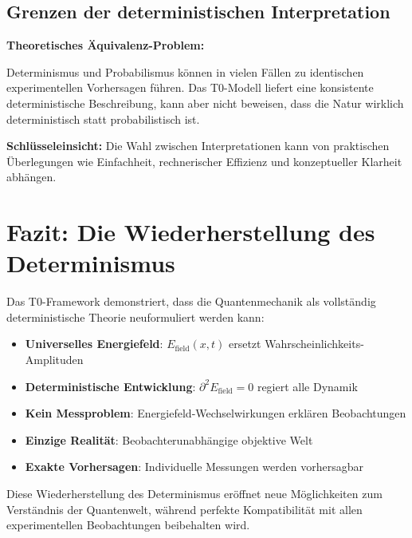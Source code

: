 \documentclass[12pt,a4paper]{report}
\begin{document}
\subsection{Grenzen der deterministischen Interpretation}
\label{subsec:limits_deterministic}

\begin{tcolorbox}[colback=yellow!5!white,colframe=orange!75!black,title=Epistemologische Warnung]
	\textbf{Theoretisches Äquivalenz-Problem:}
	
	Determinismus und Probabilismus können in vielen Fällen zu identischen experimentellen Vorhersagen führen. Das T0-Modell liefert eine konsistente deterministische Beschreibung, kann aber nicht beweisen, dass die Natur wirklich deterministisch statt probabilistisch ist.
	
	\textbf{Schlüsseleinsicht:} Die Wahl zwischen Interpretationen kann von praktischen Überlegungen wie Einfachheit, rechnerischer Effizienz und konzeptueller Klarheit abhängen.
\end{tcolorbox}

\section{Fazit: Die Wiederherstellung des Determinismus}
\label{sec:conclusion_determinism}

Das T0-Framework demonstriert, dass die Quantenmechanik als vollständig deterministische Theorie neuformuliert werden kann:

\begin{itemize}
	\item \textbf{Universelles Energiefeld}: $E_{\text{field}}(x,t)$ ersetzt Wahrscheinlichkeits-Amplituden
	\item \textbf{Deterministische Entwicklung}: $\partial^2 E_{\text{field}} = 0$ regiert alle Dynamik
	\item \textbf{Kein Messproblem}: Energiefeld-Wechselwirkungen erklären Beobachtungen
	\item \textbf{Einzige Realität}: Beobachterunabhängige objektive Welt
	\item \textbf{Exakte Vorhersagen}: Individuelle Messungen werden vorhersagbar
\end{itemize}

Diese Wiederherstellung des Determinismus eröffnet neue Möglichkeiten zum Verständnis der Quantenwelt, während perfekte Kompatibilität mit allen experimentellen Beobachtungen beibehalten wird.

\end{document}
